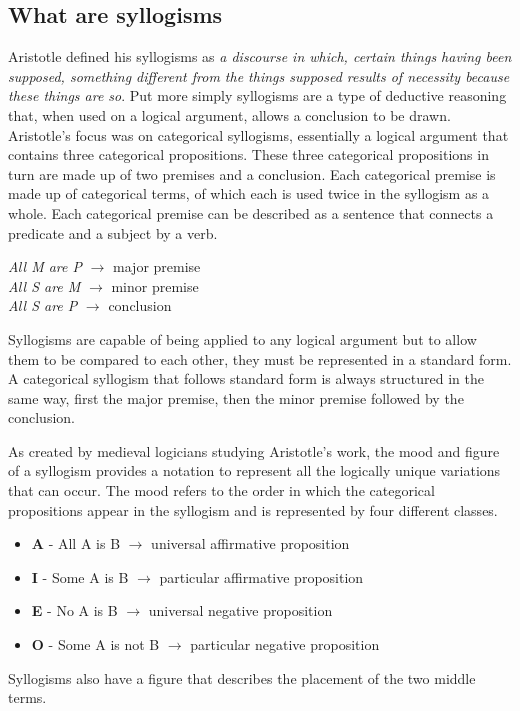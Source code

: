 \documentclass[12pt,a4paper]{report}
\newenvironment{tightcenter}{%
  \setlength\topsep{0pt}
  \setlength\parskip{0pt}
  \begin{center}
}{%
  \end{center}
}
\begin{document}
\subsection{What are syllogisms}
Aristotle defined his syllogisms as \textit{a discourse in which, certain things having been supposed, something different from the things supposed results of necessity because these things are so}. Put more simply syllogisms are a type of deductive reasoning that, when used on a logical argument, allows a conclusion to be drawn. Aristotle's focus was on categorical syllogisms, essentially a  logical argument that contains three categorical propositions. These three categorical propositions in turn are made up of two premises and a conclusion. Each categorical premise is made up of categorical terms, of which each is used twice in the syllogism as a whole. Each categorical premise can be described as a sentence that connects a predicate and a subject by a verb. 
\bigbreak
\begin{tightcenter}
\textit{All M are P} $\rightarrow$ major premise\\
\textit{All S are M} $\rightarrow$ minor premise\\
\textit{All S are P} $\rightarrow$ conclusion \\
\end{tightcenter}
\bigbreak
Syllogisms are capable of being applied to any logical argument but to allow them to be compared to each other, they must be represented in a standard form. A categorical syllogism that follows standard form is always structured in the same way, first the major premise, then the minor premise followed by the conclusion. 

As created by medieval logicians studying Aristotle's work, the mood and figure of a syllogism provides a notation to represent all the logically unique variations that can occur. The mood refers to the order in which the categorical propositions appear in the syllogism and is represented by four different classes.%
\begin{itemize}
\item \textbf{A} - All A is B $\rightarrow$ universal affirmative proposition
\item \textbf{I} - Some A is B $\rightarrow$ particular affirmative proposition
\item \textbf{E} - No A is B $\rightarrow$ universal negative  proposition
\item \textbf{O} - Some A is not B  $\rightarrow$  particular negative proposition
\end{itemize}
Syllogisms also have a figure that describes the placement of the two middle terms.
\end{document}
